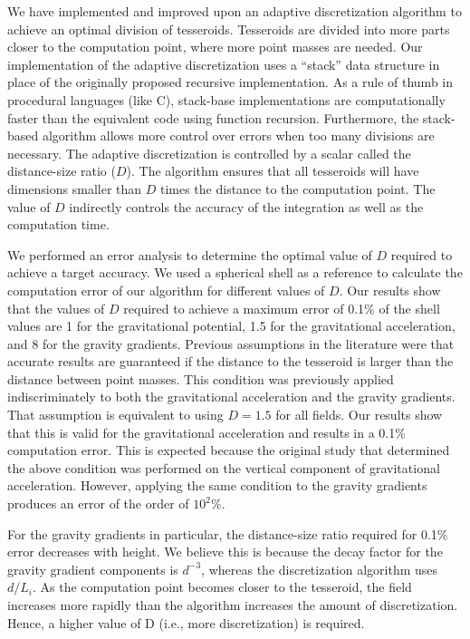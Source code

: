 We have implemented and improved upon an adaptive discretization algorithm to
achieve an optimal division of tesseroids.
Tesseroids are divided into more parts closer to the computation point,
where more point masses are needed.
Our implementation of the adaptive discretization uses a ``stack'' data
structure in place of the originally proposed recursive implementation.
As a rule of thumb in procedural languages (like C),
stack-base implementations are computationally faster
than the equivalent code using function recursion.
Furthermore, the stack-based algorithm allows more control
over errors when too many divisions are necessary.
The adaptive discretization is controlled by
a scalar called the distance-size ratio ($D$).
The algorithm ensures that all tesseroids will
have dimensions smaller than $D$ times the distance to the computation point.
The value of $D$ indirectly controls the accuracy of the integration as well as
the computation time.


We performed an error analysis to determine
the optimal value of $D$ required to achieve a target accuracy.
We used a spherical shell as a reference to calculate the computation error of
our algorithm for different values of $D$.
Our results show that the values of $D$ required to achieve a maximum error
of 0.1\% of the shell values are
1 for the gravitational potential, 1.5 for the gravitational acceleration,
and 8 for the gravity gradients.
Previous assumptions in the literature
were that accurate results are guaranteed if
the distance to the tesseroid is larger than
the distance between point masses.
This condition was previously applied indiscriminately
to both the gravitational acceleration and the gravity gradients.
That assumption is equivalent to using $D=1.5$ for all fields.
Our results show that this is valid for the gravitational
acceleration and results in a 0.1\% computation error.
This is expected because the original study that determined the above condition
was performed on the vertical component of gravitational acceleration.
However, applying the same condition to the gravity gradients produces
an error of the order of $10^2\%$.


For the gravity gradients in particular,
the distance-size ratio required for 0.1\% error decreases with height.
We believe this is because the decay factor for
the gravity gradient components is $d^{-3}$,
whereas the discretization algorithm uses $d/L_i$.
As the computation point becomes closer to the tesseroid,
the field increases more rapidly than
the algorithm increases the amount of discretization.
Hence, a higher value of D (i.e., more discretization)
is required.


